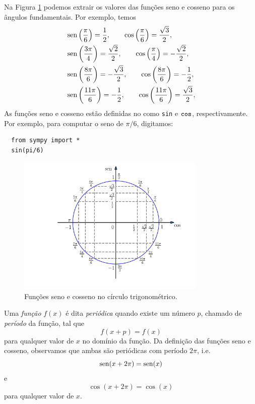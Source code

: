 Na Figura \ref{fig:cos_seno_valores} podemos extrair os valores das funções seno e cosseno para os ângulos fundamentais. Por exemplo, temos
\begin{align}
  &\operatorname{sen}\left(\frac{\pi}{6}\right) = \frac{1}{2},\qquad \cos\left(\frac{\pi}{6}\right) = \frac{\sqrt{3}}{2},\\
  &\operatorname{sen}\left(\frac{3\pi}{4}\right) = \frac{\sqrt{2}}{2},\qquad \cos\left(\frac{\pi}{4}\right) = -\frac{\sqrt{2}}{2},\\
  &\operatorname{sen}\left(\frac{8\pi}{6}\right) = -\frac{\sqrt{3}}{2},\qquad \cos\left(\frac{8\pi}{6}\right) = -\frac{1}{2},\\
  &\operatorname{sen}\left(\frac{11\pi}{6}\right) = -\frac{1}{2},\qquad \cos\left(\frac{11\pi}{6}\right) = \frac{\sqrt{3}}{2},\\
\end{align}
\ifispython
As funções seno e cosseno estão definidas no {\sympy} como \verb+sin+ e $\verb+cos+$, respectivamente. Por exemplo, para computar o seno de $\pi/6$, digitamos:
\begin{lstlisting}
  from sympy import *
  sin(pi/6)
\end{lstlisting}
\fi

\begin{figure}[H]
  \centering
  \includegraphics[width=0.8\textwidth]{./cap_funcao/dados/fig_cos_seno_valores/fig_cos_seno_valores}
  \caption{Funções seno e cosseno no círculo trigonométrico.}
  \label{fig:cos_seno_valores}
\end{figure}

Uma \emph{função} $f(x)$ é dita \emph{periódica} quando existe um número $p$, chamado de \emph{período} da função, tal que
\begin{equation}
  f(x+p) = f(x)
\end{equation}
para qualquer valor de $x$ no domínio da função. Da definição das funções seno e cosseno, observamos que ambas são periódicas com período $2\pi$, i.e.
\begin{equation}
  \operatorname{sen}(x+2\pi) = \operatorname{sen}(x)
\end{equation}
e
\begin{equation}
   \cos(x+2\pi) = \cos(x)
\end{equation}
para qualquer valor de $x$.

